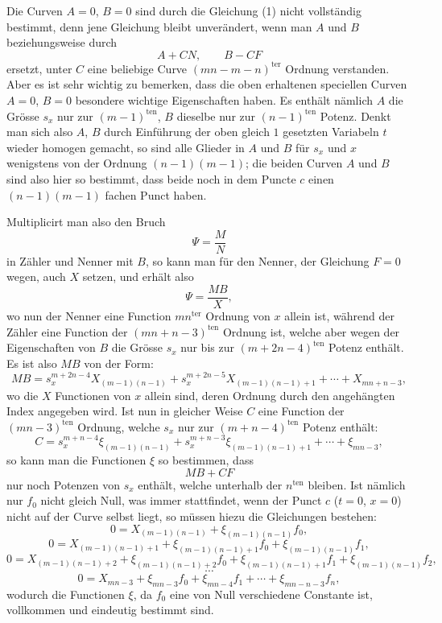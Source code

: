 \documentclass[10pt]{article}
\begin{document}
Die Curven $A=0$, $B=0$ sind durch die Gleichung (1) nicht vollständig bestimmt, denn jene Gleichung bleibt unverändert, wenn man $A$ und $B$ beziehungsweise durch
\[
A+CN,\qquad B-CF
\]
ersetzt, unter $C$ eine beliebige Curve $(mn-m-n)^{\mathrm{ter}}$ Ordnung verstanden. Aber es ist sehr wichtig zu bemerken, dass die oben erhaltenen speciellen Curven $A=0$, $B=0$ besondere wichtige Eigenschaften haben. Es enthält nämlich $A$ die Grösse $s_x$ nur zur $(m-1)^{\mathrm{ten}}$, $B$ dieselbe nur zur $(n-1)^{\mathrm{ten}}$ Potenz. Denkt man sich also $A$, $B$ durch Einführung der oben gleich $1$ gesetzten Variabeln $t$ wieder homogen gemacht, so sind alle Glieder in $A$ und $B$ für $s_x$ und $x$ wenigstens von der Ordnung $(n-1)(m-1)$; die beiden Curven $A$ und $B$ sind also hier so bestimmt, dass beide noch in dem Puncte $c$ einen $(n-1)(m-1)$ fachen Punct haben.

Multiplicirt man also den Bruch
\[
\Psi=\frac{M}{N}
\]
in Zähler und Nenner mit $B$, so kann man für den Nenner, der Gleichung $F=0$ wegen, auch $X$ setzen, und erhält also
\[
\Psi=\frac{MB}{X},
\]
wo nun der Nenner eine Function $mn^{\mathrm{ter}}$ Ordnung von $x$ allein ist, während der Zähler eine Function der $(mn+n-3)^{\mathrm{ten}}$ Ordnung ist, welche aber wegen der Eigenschaften von $B$ die Grösse $s_x$ nur bis zur $(m+2n-4)^{\mathrm{ten}}$ Potenz enthält. Es ist also $MB$ von der Form:
\[
MB=s_x^{m+2n-4}X_{(m-1)(n-1)}+s_x^{m+2n-5}X_{(m-1)(n-1)+1}+\cdots+X_{mn+n-3},
\]
wo die $X$ Functionen von $x$ allein sind, deren Ordnung durch den angehängten Index angegeben wird. Ist nun in gleicher Weise $C$ eine Function der $(mn-3)^{\mathrm{ten}}$ Ordnung, welche $s_x$ nur zur $(m+n-4)^{\mathrm{ten}}$ Potenz enthält:
\[
C=s_x^{m+n-4}\xi_{(m-1)(n-1)}+s_x^{m+n-3}\xi_{(m-1)(n-1)+1}+\cdots+\xi_{mn-3},
\]
so kann man die Functionen $\xi$ so bestimmen, dass
\[
MB+CF
\]
nur noch Potenzen von $s_x$ enthält, welche unterhalb der $n^{\mathrm{ten}}$ bleiben. Ist nämlich nur $f_0$ nicht gleich Null, was immer stattfindet, wenn der Punct $c$ ($t=0$, $x=0$) nicht auf der Curve selbst liegt, so müssen hiezu die Gleichungen bestehen:
\[
0=X_{(m-1)(n-1)}+\xi_{(m-1)(n-1)}f_0,
\]
\[
0=X_{(m-1)(n-1)+1}+\xi_{(m-1)(n-1)+1}f_0+\xi_{(m-1)(n-1)}f_1,
\]
\[
0=X_{(m-1)(n-1)+2}+\xi_{(m-1)(n-1)+2}f_0+\xi_{(m-1)(n-1)+1}f_1+\xi_{(m-1)(n-1)}f_2,
\]
\[
\cdots
\]
\[
0=X_{mn-3}+\xi_{mn-3}f_0+\xi_{mn-4}f_1+\cdots+\xi_{mn-n-3}f_n,
\]
wodurch die Functionen $\xi$, da $f_0$ eine von Null verschiedene Constante ist, vollkommen und eindeutig bestimmt sind.
\end{document}
